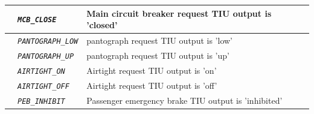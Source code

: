 \documentclass{template/openetcs}
\begin{document}
\begin{itemize}
\begin{longtable}{|l|l|l|}
			\hline

			&	\begin{minipage}[t]{0.40\linewidth} \emph{\texttt{MCB\_CLOSE}} \end{minipage}
			&	\begin{minipage}[t]{0.38\linewidth} Main circuit breaker request TIU output is ’closed’ \end{minipage} \\ 

			\hline

			&	\begin{minipage}[t]{0.40\linewidth} \emph{\texttt{PANTOGRAPH\_LOW}} \end{minipage}
			&	\begin{minipage}[t]{0.38\linewidth} pantograph request TIU output is ’low’ \end{minipage} \\ 

			\hline

			&	\begin{minipage}[t]{0.40\linewidth} \emph{\texttt{PANTOGRAPH\_UP}} \end{minipage}
			&	\begin{minipage}[t]{0.38\linewidth} pantograph request TIU output is ’up’ \end{minipage} \\ 

			\hline

			&	\begin{minipage}[t]{0.40\linewidth} \emph{\texttt{AIRTIGHT\_ON}} \end{minipage}
			&	\begin{minipage}[t]{0.38\linewidth} Airtight request TIU output is ’on’ \end{minipage} \\ 

			\hline

			&	\begin{minipage}[t]{0.40\linewidth} \emph{\texttt{AIRTIGHT\_OFF}} \end{minipage}
			&	\begin{minipage}[t]{0.38\linewidth} Airtight request TIU output is ’off’ \end{minipage} \\ 

			\hline

			&	\begin{minipage}[t]{0.40\linewidth} \emph{\texttt{PEB\_INHIBIT}} \end{minipage}
			&	\begin{minipage}[t]{0.38\linewidth} Passenger emergency brake TIU output is ’inhibited’ \end{minipage} \\ 


\end{longtable}
\end{itemize}
\end{document}
